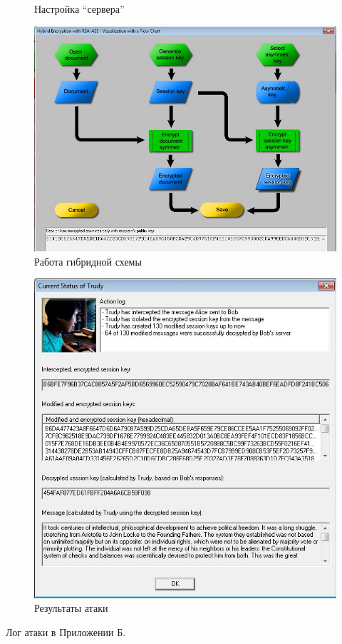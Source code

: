 \documentclass[a4paper, 14pt]{extarticle}
\begin{document}
\begin{enumerate}
\begin{figure}[h]
        \caption{Настройка ``сервера''}%
        \label{img:e:2}
    \end{figure}
    
    \begin{figure}[h]
        \centering
        \includegraphics[width=\textwidth]{img/S009.jpg}
        \caption{Работа гибридной схемы}%
        \label{img:e:3}
    \end{figure}
    
    \begin{figure}[h]
        \centering
        \includegraphics[width=\textwidth]{img/S011.jpg}
        \caption{Результаты атаки}%
        \label{img:e:4}
    \end{figure}
    Лог атаки в Приложении Б.
    
\end{enumerate}
\end{document}
